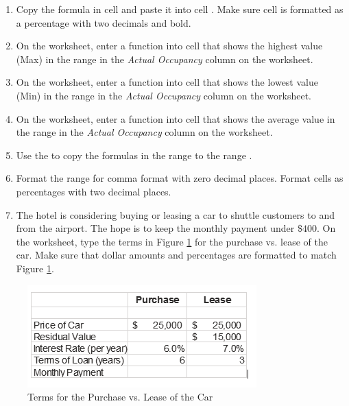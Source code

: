 \begin{enumerate}
	\item Copy the formula in cell  and paste it into cell . Make sure cell  is formatted as a percentage with two decimals and bold.
	
	\item On the  worksheet, enter a function into cell  that shows the highest value (Max) in the range  in the \textit{Actual Occupancy} column on the  worksheet.
	
	\item On the  worksheet, enter a function into cell  that shows the lowest value (Min) in the range  in the \textit{Actual Occupancy} column on the  worksheet.
	
	\item On the  worksheet, enter a function into cell  that shows the average value in the range  in the \textit{Actual Occupancy} column on the  worksheet.
	
	\item Use the  to copy the formulas in the range  to the range .
	
	\item Format the range  for comma format with zero decimal places. Format cells  as percentages with two decimal places.
	
	\item The hotel is considering buying or leasing a car to shuttle customers to and from the airport. The hope is to keep the monthly payment under $ \$400 $. On the  worksheet, type the terms in Figure \ref{02:fig50} for the purchase vs. lease of the car. Make sure that dollar amounts and percentages are formatted to match Figure \ref{02:fig50}.
	\end{enumerate}

\begin{figure}[H]
	\centering
	\includegraphics[width=\maxwidth{.95\linewidth}]{gfx/ch02_fig50}
	\caption{Terms for the Purchase vs. Lease of the Car}
	\label{02:fig50}
\end{figure}

